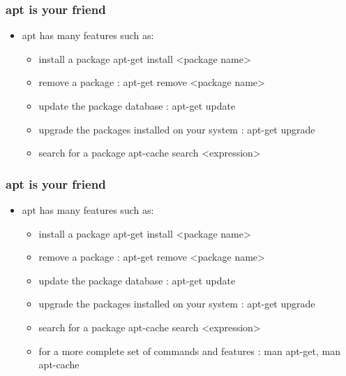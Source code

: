 \begin{frame}
    \frametitle{apt is your friend}
    \begin{itemize}
        \item apt has many features such as:
        \begin{itemize}
            \item install a package apt-get install <package name>
            \item remove a package : apt-get remove <package name>
            \item update the package database : apt-get update
            \item upgrade the packages installed on your system : apt-get upgrade
            \item search for a package apt-cache search <expression>
        \end{itemize}
    \end{itemize}
\end{frame}
\begin{frame}
    \frametitle{apt is your friend}
    \begin{itemize}
        \item apt has many features such as:
        \begin{itemize}
            \item install a package apt-get install <package name>
            \item remove a package : apt-get remove <package name>
            \item update the package database : apt-get update
            \item upgrade the packages installed on your system : apt-get upgrade
            \item search for a package apt-cache search <expression>
            \item for a more complete set of commands and features : man
            apt-get, man apt-cache
        \end{itemize}
    \end{itemize}
\end{frame}
